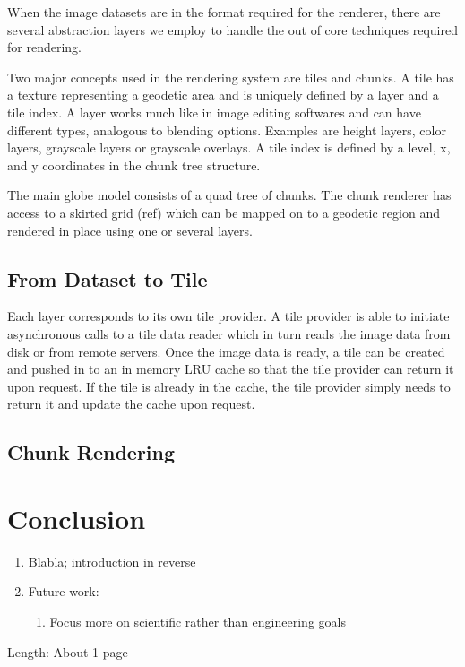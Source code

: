 \documentclass[journal]{vgtc}                %
\begin{document}
When the image datasets are in the format required for the renderer, there are several abstraction layers we employ to handle the out of core techniques required for rendering.

Two major concepts used in the rendering system are tiles and chunks. A tile has a texture representing a geodetic area and is uniquely defined by a layer and a tile index.
A layer works much like in image editing softwares and can have different types, analogous to blending options.
Examples are height layers, color layers, grayscale layers or grayscale overlays.
A tile index is defined by a level, x, and y coordinates in the chunk tree structure.

The main globe model consists of a quad tree of chunks.
The chunk renderer has access to a skirted grid (ref) which can be mapped on to a geodetic region and rendered in place using one or several layers.

\subsection{From Dataset to Tile}

Each layer corresponds to its own tile provider.
A tile provider is able to initiate asynchronous calls to a tile data reader which in turn reads the image data from disk or from remote servers.
Once the image data is ready, a tile can be created and pushed in to an in memory LRU cache so that the tile provider can return it upon request.
If the tile is already in the cache, the tile provider simply needs to return it and update the cache upon request.

\subsection{Chunk Rendering}




\section{Conclusion} \label{sec:system}
\begin{enumerate}
  \item Blabla; introduction in reverse
  \item Future work:
  \begin{enumerate}
    \item Focus more on scientific rather than engineering goals
  \end{enumerate}
\end{enumerate}
Length: About 1 page


%

%
%
%


\end{document}
